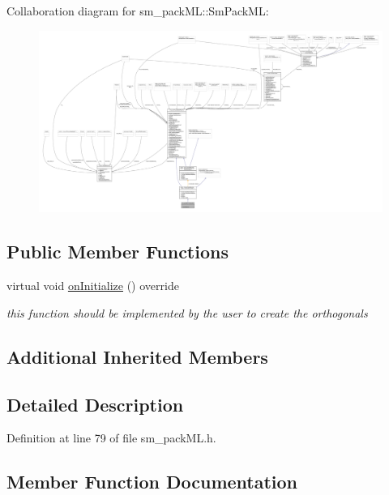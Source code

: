 Collaboration diagram for sm\+\_\+pack\+ML\+:\+:Sm\+Pack\+ML\+:
\nopagebreak
\begin{figure}[H]
\begin{center}
\leavevmode
\includegraphics[width=350pt]{structsm__packML_1_1SmPackML__coll__graph}
\end{center}
\end{figure}
\subsection*{Public Member Functions}
\begin{DoxyCompactItemize}
\item 
virtual void \hyperlink{structsm__packML_1_1SmPackML_a63aa0e31bcdf6c9584011d14bc6ec8af}{on\+Initialize} () override
\begin{DoxyCompactList}\small\item\em this function should be implemented by the user to create the orthogonals \end{DoxyCompactList}\end{DoxyCompactItemize}
\subsection*{Additional Inherited Members}


\subsection{Detailed Description}


Definition at line 79 of file sm\+\_\+pack\+M\+L.\+h.



\subsection{Member Function Documentation}
